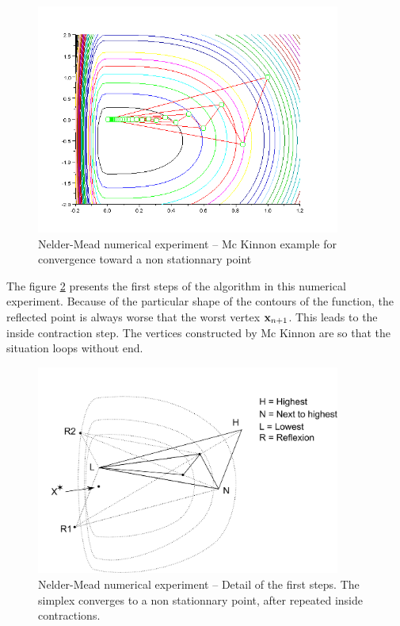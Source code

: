 \begin{figure}
\begin{center}
\includegraphics[width=10cm]{mckinnon-history-simplex.png}
\end{center}
\caption{Nelder-Mead numerical experiment -- Mc Kinnon example for convergence toward
a non stationnary point}
\label{fig-nm-numexp-mckinnon}
\end{figure}

The figure \ref{fig-nm-numexp-mckinnon-detail} presents the first steps 
of the algorithm in this numerical experiment. Because of the 
particular shape of the contours of the function, the reflected 
point is always worse that the worst vertex $\mathbf{x}_{n+1}$. This 
leads to the inside contraction step. The vertices constructed 
by Mc Kinnon are so that the situation loops without end.

\begin{figure}
\begin{center}
\includegraphics[width=10cm]{mcKinnon-insidecontraction.pdf}
\end{center}
\caption{Nelder-Mead numerical experiment -- Detail of the first steps.
The simplex converges to a non stationnary point, after repeated 
inside contractions.}
\label{fig-nm-numexp-mckinnon-detail}
\end{figure}

